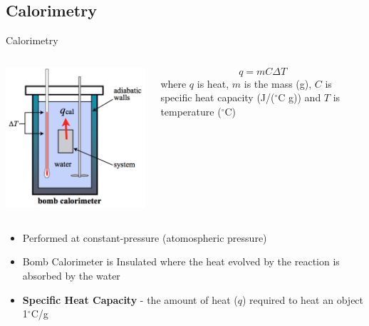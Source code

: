 \documentclass[11pt]{beamer}
\begin{document}
\subsection{Calorimetry}

\begin{frame}{Calorimetry}
  \begin{columns}
    \begin{center}
      \includegraphics[scale=0.3]{bomb_calor}
    \end{center}
    \begin{equation}
      q = mC\Delta T
    \end{equation}
    where $q$ is heat, $m$ is the mass (g), $C$ is
    specific heat capacity (J/($^\circ$C g)) and $T$ is
    temperature ($^\circ$C)
  \end{columns}
  
  \begin{itemize}
  \item Performed at constant-pressure (atomospheric pressure)
  \item Bomb Calorimeter is Insulated where the heat evolved by the reaction
    is absorbed by the water
  \item \textbf{Specific Heat Capacity} - the amount of heat ($q$)
    required to heat an object 1$^\circ$C/g
  \end{itemize}
\end{frame}
\end{document}
